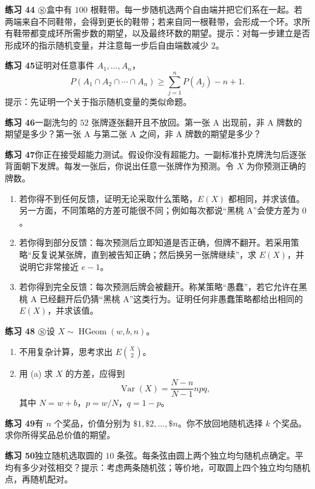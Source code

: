 \documentclass[UTF8, 12pt, fontset=fandol, oneside]{ctexart}
\begin{document}
\noindent\textbf{练习 44 $\circledS$}\quad 盒中有 $100$ 根鞋带。每一步随机选两个自由端并把它们系在一起。若两端来自不同鞋带，会得到更长的鞋带；若来自同一根鞋带，会形成一个环。求所有鞋带都变成环所需步数的期望，以及最终环数的期望。提示：对每一步建立是否形成环的指示随机变量，并注意每一步后自由端数减少 $2$。

\noindent\textbf{练习 45}\quad 证明对任意事件 $A_1,\ldots,A_n$，
\[
  P(A_1\cap A_2\cap\cdots\cap A_n)\ge \sum_{j=1}^n P(A_j)-n+1.
\]
提示：先证明一个关于指示随机变量的类似命题。

\noindent\textbf{练习 46}\quad 一副洗匀的 $52$ 张牌逐张翻开且不放回。第一张 A 出现前，非 A 牌数的期望是多少？第一张 A 与第二张 A 之间，非 A 牌数的期望是多少？

\noindent\textbf{练习 47}\quad 你正在接受超能力测试。假设你没有超能力。一副标准扑克牌洗匀后逐张背面朝下发牌。每发一张后，你说出任意一张牌作为预测。令 $X$ 为你预测正确的牌数。
\begin{enumerate}
  \item[(a)] 若你得不到任何反馈，证明无论采取什么策略，$E(X)$ 都相同，并求该值。另一方面，不同策略的方差可能很不同；例如每次都说“黑桃 A”会使方差为 $0$。
  \item[(b)] 若你得到部分反馈：每次预测后立即知道是否正确，但牌不翻开。若采用策略“反复说某张牌，直到被告知正确；然后换另一张牌继续”，求 $E(X)$，并说明它非常接近 $e-1$。
  \item[(c)] 若你得到完全反馈：每次预测后牌会被翻开。称某策略“愚蠢”，若它允许在黑桃 A 已经翻开后仍猜“黑桃 A”这类行为。证明任何非愚蠢策略都给出相同的 $E(X)$，并求该值。
\end{enumerate}

\noindent\textbf{练习 48 $\circledS$}\quad 设 $X\sim\operatorname{HGeom}(w,b,n)$。
\begin{enumerate}
  \item[(a)] 不用复杂计算，思考求出 $E\binom{X}{2}$。
  \item[(b)] 用 (a) 求 $X$ 的方差，应得到
  \[
    \operatorname{Var}(X)=\frac{N-n}{N-1}npq,
  \]
  其中 $N=w+b$，$p=w/N$，$q=1-p$。
\end{enumerate}

\noindent\textbf{练习 49}\quad 有 $n$ 个奖品，价值分别为 $\$1,\$2,\ldots,\$n$。你不放回地随机选择 $k$ 个奖品。求你所得奖品总价值的期望。

\noindent\textbf{练习 50}\quad 独立随机选取圆的 $10$ 条弦。每条弦由圆上两个独立均匀随机点确定。平均有多少对弦相交？提示：考虑两条随机弦；等价地，可取圆上四个独立均匀随机点，再随机配对。
\end{document}
